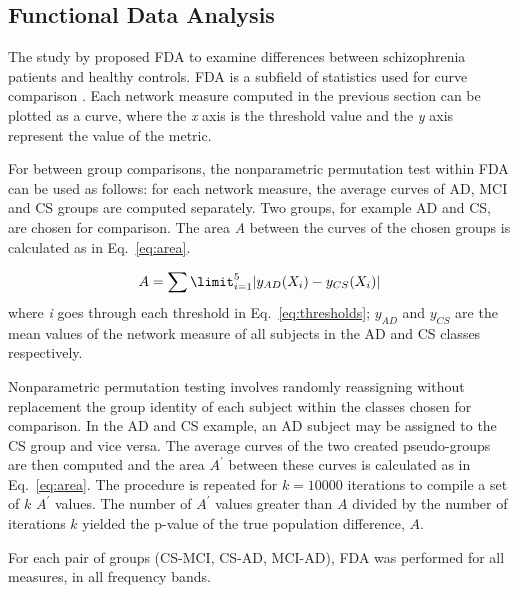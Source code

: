 		\subsection{Functional Data Analysis}
			The study by \textcite{Bassett2012} proposed \ac{FDA} to examine differences between schizophrenia patients and healthy controls. \ac{FDA} is a subfield of statistics used for curve comparison \autocite{Ramsay2005}. Each network measure computed in the previous section can be plotted as a curve, where the \textit{x} axis is the threshold value and the \textit{y} axis represent the value of the metric. 

			For between group comparisons, the nonparametric permutation test within \ac{FDA} can be used as follows: for each network measure, the average curves of \ac{AD}, \ac{MCI} and \ac{CS} groups are computed separately. Two groups, for example \ac{AD} and \ac{CS}, are chosen for comparison. The area \textit{A} between the curves of the chosen groups is calculated as in Eq.~\ref{eq:area}.

			\begin{equation}\label{eq:area}		
				A = \sum\limit_{i=1}^{5} |y_{AD}(X_i) - y_{CS}(X_i)|
			\end{equation}
			where \textit{i} goes through each threshold in Eq.~\ref{eq:thresholds}; \(y_{AD}\) and \(y_{CS}\) are the mean values of the network measure of all subjects in the \ac{AD} and \ac{CS} classes respectively. 

			Nonparametric permutation testing involves randomly reassigning without replacement the group identity of each subject within the classes chosen for comparison. In the \ac{AD} and \ac{CS} example, an \ac{AD} subject may be assigned to the \ac{CS} group and vice versa. The average curves of the two created pseudo-groups are then computed and the area \(A^\prime\) between these curves is calculated as in Eq.~\ref{eq:area}. The procedure is repeated for \(k=10000\) iterations to compile a set of \(k\) \(A^\prime\) values. The number of \(A^\prime\) values greater than \(A\) divided by the number of iterations \(k\) yielded the p-value of the true population difference, \(A\).  

			For each pair of groups (\ac{CS}-\ac{MCI}, \ac{CS}-\ac{AD}, \ac{MCI}-\ac{AD}), \ac{FDA} was performed for all measures, in all frequency bands.     


